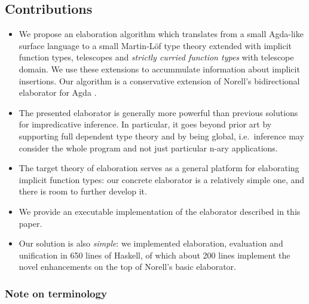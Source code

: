 \documentclass[acmsmall,review,anonymous,prologue,dvipsnames]{acmart}\settopmatter{printfolios=true,printccs=false,printacmref=false}
\theoremstyle{remark}
\begin{document}
\subsection{Contributions}
\begin{itemize}
  \item We propose an elaboration algorithm which translates from a small
    Agda-like surface language to a small Martin-L\"of type theory extended with
    implicit function types, telescopes and \emph{strictly curried function
      types} with telescope domain. We use these extensions to accummulate
    information about implicit insertions. Our algorithm is a conservative
    extension of Norell's bidirectional elaborator for Agda
    \cite[Chapter~3]{norell07thesis}.
  \item The presented elaborator is generally more powerful than previous
    solutions for impredicative inference. In particular, it goes beyond prior
    art by supporting full dependent type theory and by being global,
    i.e.\ inference may consider the whole program and not just particular n-ary
    applications.
  \item The target theory of elaboration serves as a general platform for
    elaborating implicit function types: our concrete elaborator is a relatively
    simple one, and there is room to further develop it.
  \item We provide an executable implementation of the elaborator described in
    this paper.
  \item Our solution is also \emph{simple}: we implemented elaboration,
    evaluation and unification in 650 lines of Haskell, of which about 200 lines
    implement the novel enhancements on the top of Norell's basic elaborator.
\end{itemize}

\subsubsection{Note on terminology}
\end{document}
